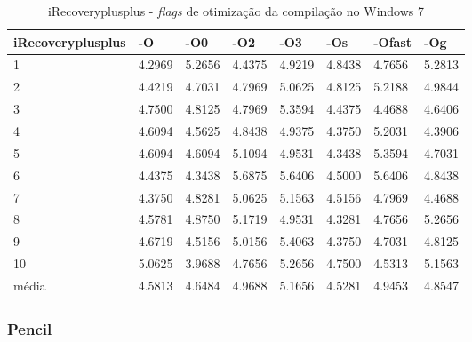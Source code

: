 \begin{apendicesenv}
\begin{table}[!ht]
\tiny
\centering
\caption{iRecoveryplusplus - \textit{flags} de otimização da compilação no Windows 7}
\label{tab:otimizacao_compilacao:windows:irecoveryplusplus}
\begin{tabular}{llllllll}
\textbf{iRecoveryplusplus} & \textbf{-O}  & \textbf{-O0}   & \textbf{-O2} & \textbf{-O3} & \textbf{-Os} & \textbf{-Ofast} & \textbf{-Og} \\ \toprule
1                          &   4.2969     &    5.2656      & 4.4375       & 4.9219       &  4.8438      &   4.7656        &  5.2813  \\ 
2                          &   4.4219     &    4.7031      & 4.7969       & 5.0625       &  4.8125      &   5.2188        &  4.9844  \\ 
3                          &   4.7500     &    4.8125      & 4.7969       & 5.3594       &  4.4375      &   4.4688        &  4.6406  \\ 
4                          &   4.6094     &    4.5625      & 4.8438       & 4.9375       &  4.3750      &   5.2031        &  4.3906  \\ 
5                          &   4.6094     &    4.6094      & 5.1094       & 4.9531       &  4.3438      &   5.3594        &  4.7031  \\ 
6                          &   4.4375     &    4.3438      & 5.6875       & 5.6406       &  4.5000      &   5.6406        &  4.8438  \\ 
7                          &   4.3750     &    4.8281      & 5.0625       & 5.1563       &  4.5156      &   4.7969        &  4.4688  \\ 
8                          &   4.5781     &    4.8750      & 5.1719       & 4.9531       &  4.3281      &   4.7656        &  5.2656  \\ 
9                          &   4.6719     &    4.5156      & 5.0156       & 5.4063       &  4.3750      &   4.7031        &  4.8125  \\ 
10                         &   5.0625     &    3.9688      & 4.7656       & 5.2656       &  4.7500      &   4.5313        &  5.1563  \\ \bottomrule
média                      &   4.5813     &    4.6484      & 4.9688       & 5.1656       &  4.5281      &   4.9453        &  4.8547  \\ 
\end{tabular}
\end{table}

\clearpage
\subsubsection*{Pencil}


\end{apendicesenv}
